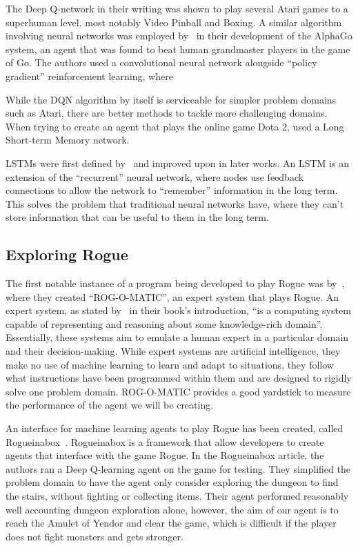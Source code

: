 \documentclass[12pt,a4paper]{article}
\begin{document}
    The Deep Q-network in their writing was shown to play several Atari games to a superhuman level, most notably Video Pinball and Boxing.
    A similar algorithm involving neural networks was employed by~\citet{silver16} in their development of the AlphaGo system, an agent that was found to beat human grandmaster players in the game of Go. The authors used a convolutional neural network alongside ``policy gradient'' reinforcement learning, where

    While the DQN algorithm by itself is serviceable for simpler problem domains such as Atari, there are better methods to tackle more challenging domains.
    When trying to create an agent that plays the online game Dota 2, \citet{berner19} used a Long Short-term Memory network.

    LSTMs were first defined by~\citet{hochreiter97} and improved upon in later works.
    An LSTM is an extension of the ``recurrent'' neural network, where nodes use feedback connections to allow the network to ``remember'' information in the long term.
    This solves the problem that traditional neural networks have, where they can't store information that can be useful to them in the long term.

    \subsection{Exploring Rogue}\label{subsec:exploring-rogue}

    The first notable instance of a program being developed to play Rogue was by~\citet{mauldin83}, where they created ``ROG-O-MATIC'', an expert system that plays Rogue.
    An expert system, as stated by~\citet{jackson86} in their book's introduction, ``is a computing system capable of representing and reasoning about some knowledge-rich domain''.
    Essentially, these systems aim to emulate a human expert in a particular domain and their decision-making.
    While expert systems are artificial intelligence, they make no use of machine learning to learn and adapt to situations, they follow what instructions have been programmed within them and are designed to rigidly solve one problem domain.
    ROG-O-MATIC provides a good yardstick to measure the performance of the agent we will be creating.

    An interface for machine learning agents to play Rogue has been created, called Rogueinabox~\citep{asperti17}.
    Rogueinabox is a framework that allow developers to create agents that interface with the game Rogue.
    In the Rogueinabox article, the authors ran a Deep Q-learning agent on the game for testing.
    They simplified the problem domain to have the agent only consider exploring the dungeon to find the stairs, without fighting or collecting items.
    Their agent performed reasonably well accounting dungeon exploration alone, however, the aim of our agent is to reach the Amulet of Yendor and clear the game, which is difficult if the player does not fight monsters and gets stronger.
\end{document}
